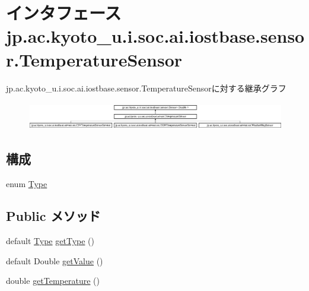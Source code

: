 \hypertarget{interfacejp_1_1ac_1_1kyoto__u_1_1i_1_1soc_1_1ai_1_1iostbase_1_1sensor_1_1_temperature_sensor}{\section{インタフェース jp.\-ac.\-kyoto\-\_\-u.\-i.\-soc.\-ai.\-iostbase.\-sensor.\-Temperature\-Sensor}
\label{interfacejp_1_1ac_1_1kyoto__u_1_1i_1_1soc_1_1ai_1_1iostbase_1_1sensor_1_1_temperature_sensor}
}
jp.\-ac.\-kyoto\-\_\-u.\-i.\-soc.\-ai.\-iostbase.\-sensor.\-Temperature\-Sensorに対する継承グラフ\begin{figure}[H]
\begin{center}
\leavevmode
\includegraphics[height=1.252796cm]{interfacejp_1_1ac_1_1kyoto__u_1_1i_1_1soc_1_1ai_1_1iostbase_1_1sensor_1_1_temperature_sensor}
\end{center}
\end{figure}
\subsection*{構成}
\begin{DoxyCompactItemize}
\item 
enum \hyperlink{enumjp_1_1ac_1_1kyoto__u_1_1i_1_1soc_1_1ai_1_1iostbase_1_1sensor_1_1_temperature_sensor_1_1_type}{Type}
\end{DoxyCompactItemize}
\subsection*{Public メソッド}
\begin{DoxyCompactItemize}
\item 
default \hyperlink{enumjp_1_1ac_1_1kyoto__u_1_1i_1_1soc_1_1ai_1_1iostbase_1_1sensor_1_1_temperature_sensor_1_1_type}{Type} \hyperlink{interfacejp_1_1ac_1_1kyoto__u_1_1i_1_1soc_1_1ai_1_1iostbase_1_1sensor_1_1_temperature_sensor_adf6976369c86d133e233d2d352bf615e}{get\-Type} ()
\item 
default Double \hyperlink{interfacejp_1_1ac_1_1kyoto__u_1_1i_1_1soc_1_1ai_1_1iostbase_1_1sensor_1_1_temperature_sensor_a7dc13ecf4cd15caff2063ef5649238b4}{get\-Value} ()
\item 
double \hyperlink{interfacejp_1_1ac_1_1kyoto__u_1_1i_1_1soc_1_1ai_1_1iostbase_1_1sensor_1_1_temperature_sensor_a653eaf8ec7e267a3723d6ae0ec4669fb}{get\-Temperature} ()
\end{DoxyCompactItemize}


